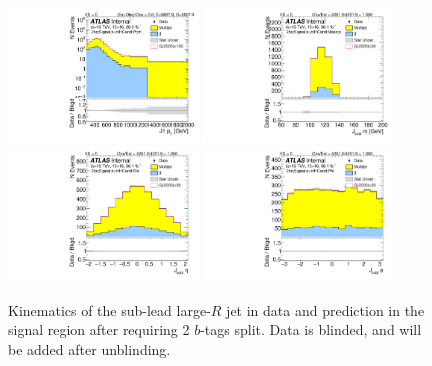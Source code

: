 \begin{figure}[htbp!]
\begin{center}
\includegraphics[width=0.45\textwidth,angle=-90]{figures/boosted/Signal/b77_TwoTag_split_Signal_sublHCand_Pt_m_1_blind.pdf}
\includegraphics[width=0.45\textwidth,angle=-90]{figures/boosted/Signal/b77_TwoTag_split_Signal_sublHCand_Mass_s_blind.pdf}\\
\includegraphics[width=0.45\textwidth,angle=-90]{figures/boosted/Signal/b77_TwoTag_split_Signal_sublHCand_Eta_blind.pdf}
\includegraphics[width=0.45\textwidth,angle=-90]{figures/boosted/Signal/b77_TwoTag_split_Signal_sublHCand_Phi_blind.pdf}
  \caption{Kinematics of the sub-lead large-$R$ jet in data and prediction in the signal region after requiring 2 $b$-tags split. Data is blinded, and will be added after unblinding.}
  \label{fig:boosted-2bs-signal-blind-ak10-subl}
\end{center}
\end{figure}

